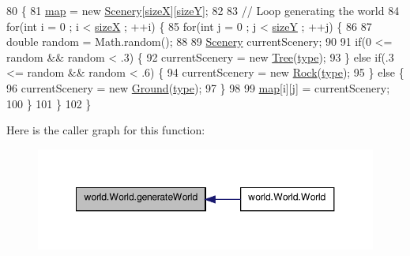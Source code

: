 \begin{DoxyCode}
80                                    \{
81         \hyperlink{classworld_1_1_world_ab586ab2ff7a28c66e492722dd30a2d5a}{map} = \textcolor{keyword}{new} \hyperlink{classworld_1_1scenery_1_1_scenery}{Scenery}[\hyperlink{classworld_1_1_world_ab2ca92c9d2a56f6fa1872dc6cf0f4ab3}{sizeX}][\hyperlink{classworld_1_1_world_a3a110ad1276dc7dfa6bc47d9a663ec5e}{sizeY}];
82 
83         \textcolor{comment}{// Loop generating the world}
84         \textcolor{keywordflow}{for}(\textcolor{keywordtype}{int} i = 0 ; i < \hyperlink{classworld_1_1_world_ab2ca92c9d2a56f6fa1872dc6cf0f4ab3}{sizeX} ; ++i) \{
85             \textcolor{keywordflow}{for}(\textcolor{keywordtype}{int} j = 0 ; j < \hyperlink{classworld_1_1_world_a3a110ad1276dc7dfa6bc47d9a663ec5e}{sizeY} ; ++j) \{
86 
87                 \textcolor{keywordtype}{double} random = Math.random();
88 
89                 \hyperlink{classworld_1_1scenery_1_1_scenery}{Scenery} currentScenery;
90 
91                 \textcolor{keywordflow}{if}(0 <= random && random < .3) \{
92                     currentScenery = \textcolor{keyword}{new} \hyperlink{classworld_1_1scenery_1_1_tree}{Tree}(\hyperlink{classworld_1_1_world_a008564127f7e69c09224a84ca7081893}{type});
93                 \} \textcolor{keywordflow}{else} \textcolor{keywordflow}{if}(.3 <= random && random < .6) \{
94                     currentScenery = \textcolor{keyword}{new} \hyperlink{classworld_1_1scenery_1_1_rock}{Rock}(\hyperlink{classworld_1_1_world_a008564127f7e69c09224a84ca7081893}{type});
95                 \} \textcolor{keywordflow}{else} \{
96                     currentScenery = \textcolor{keyword}{new} \hyperlink{classworld_1_1scenery_1_1_ground}{Ground}(\hyperlink{classworld_1_1_world_a008564127f7e69c09224a84ca7081893}{type});
97                 \}
98 
99                 \hyperlink{classworld_1_1_world_ab586ab2ff7a28c66e492722dd30a2d5a}{map}[i][j] = currentScenery;
100             \}
101         \}
102     \}
\end{DoxyCode}


Here is the caller graph for this function\-:
\nopagebreak
\begin{figure}[H]
\begin{center}
\leavevmode
\includegraphics[width=348pt]{classworld_1_1_world_aad82a66d1f2f8a7c8afa0483692754e8_icgraph}
\end{center}
\end{figure}


